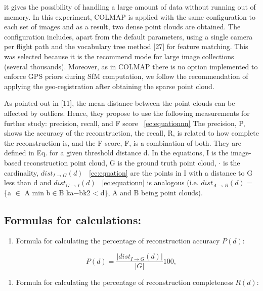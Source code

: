 \documentclass[9pt,a4paper,twoside]{tau}
\begin{document}
{it gives the possibility of handling a large amount of data without running out of memory. In
this experiment, COLMAP is applied with the same configuration to each set of images and as a result, two dense point
clouds are obtained. The configuration includes, apart from the default parameters, using a single camera per flight
path and the vocabulary tree method [27] for feature matching. This was selected because it
is the recommend mode for large image collections (several thousands). Moreover, as in COLMAP there is no option
implemented to enforce GPS priors during SfM computation, we follow the recommendation of applying the geo-registration
after obtaining the sparse point cloud.}

{As pointed out in [11], the mean distance between the point clouds can be affected by
outliers. Hence, they propose to use the following measurements for further study: precision, recall, and F score ~\eqref{ec:equationnn} The
precision, P, shows the accuracy of the reconstruction, the recall, R, is related to how complete the reconstruction
is, and the F score, F, is a combination of both. They are defined in Eq. for a given threshold distance d. In the
equations, I is the image-based reconstruction point cloud, G is the ground truth point cloud, {\textbar} $\cdot $
{\textbar} is the cardinality, $\mathit{dist}_{I\rightarrow G}\left(d\right)$ ~\eqref{ec:equation} are the points in I with a distance to G less than d and $\mathit{dist}_{G\rightarrow I}\left(d\right)$ ~\eqref{ec:equationn} is
analogous (i.e. $\mathit{dist}_{A\rightarrow B}\left(d\right)$ = \{a ${\in}$ A {\textbar} min b${\in}$B ka$-$bk2 {\textless} d\}, A and B being point
clouds).}
            
\subsection{Formulas for calculations:}
\begin{enumerate}[series=listWWNumxv,label=\arabic*),ref=\arabic*]
\item 
Formula for calculating the percentage of reconstruction accuracy  $P\left(d\right)$:
\end{enumerate} 

	\begin{equation} \label{ec:equation}
            P(d)=\frac{\left|\mathit{dist}_{I\rightarrow G}\left(d\right)\right|}{\left|G\right|}100,
	\end{equation}

 \begin{enumerate}[resume*=listWWNumxv]
\item 
Formula for calculating the percentage of reconstruction completeness  $R\left(d\right)$:
\end{enumerate}
\end{document}
